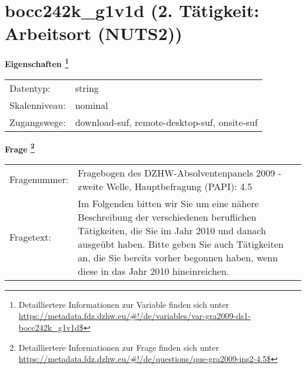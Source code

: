 
    \setcounter{footnote}{0}

    \vspace*{-1.8cm}
	\section{bocc242k\_g1v1d (2. Tätigkeit: Arbeitsort (NUTS2))}
	\label{section:bocc242k_g1v1d}



    \vspace*{0.5cm}
    \noindent\textbf{Eigenschaften
	\footnote{Detailliertere Informationen zur Variable finden sich unter
		\url{https://metadata.fdz.dzhw.eu/\#!/de/variables/var-gra2009-ds1-bocc242k_g1v1d$}}}\\
	\begin{tabularx}{\hsize}{@{}lX}
	Datentyp: & string \\
	Skalenniveau: & nominal \\
	Zugangswege: &
	  download-suf, 
	  remote-desktop-suf, 
	  onsite-suf
 \\
    \end{tabularx}



				\vspace*{0.5cm}
                \noindent\textbf{Frage
	                \footnote{Detailliertere Informationen zur Frage finden sich unter
		              \url{https://metadata.fdz.dzhw.eu/\#!/de/questions/que-gra2009-ins2-4.5$}}}\\
				\begin{tabularx}{\hsize}{@{}lX}
					Fragenummer: &
					  Fragebogen des DZHW-Absolventenpanels 2009 - zweite Welle, Hauptbefragung (PAPI):
					  4.5
 \\
					Fragetext: & Im Folgenden bitten wir Sie um eine nähere Beschreibung der verschiedenen beruflichen Tätigkeiten, die Sie im Jahr 2010 und danach ausgeübt haben. Bitte geben Sie auch Tätigkeiten an, die Sie bereits vorher begonnen haben, wenn diese in das Jahr 2010 hineinreichen. \\
				\end{tabularx}






